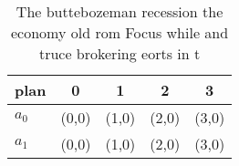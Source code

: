 \documentclass[a4paper]{article}
\begin{document}
\begin{table}
\begin{adjustbox}{width=0.6\columnwidth}
\begin{tabular}{|l|l|l|l|l|}
\hline
\textbf{plan} & \multicolumn{1}{c|}{\textbf{0}} & \multicolumn{1}{c|}{\textbf{1}} & \multicolumn{1}{c|}{\textbf{2}} & \multicolumn{1}{c|}{\textbf{3}} \\ \hline
\textbf{$a_0$}  & (0,0) & (1,0) & (2,0) & (3,0) \\ \hline
\textbf{$a_1$}  & (0,0) & (1,0) & (2,0) & (3,0) \\ \hline
\end{tabular}
\end{adjustbox}
\caption{The buttebozeman recession the economy old rom Focus while and truce brokering eorts in t
}
\end{table}
\end{document}
